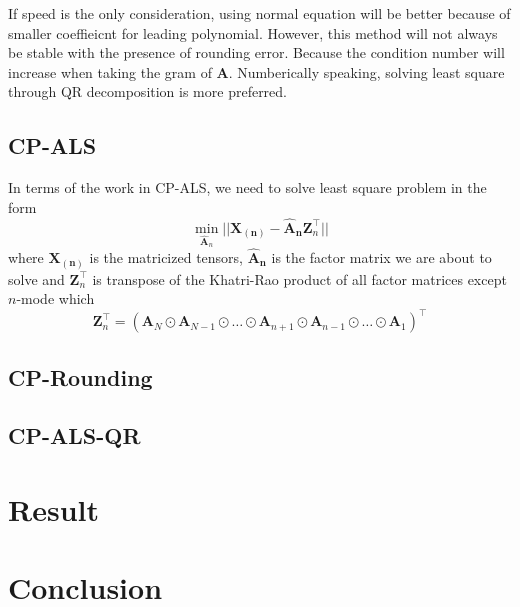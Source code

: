 \documentclass{article}
\newcommand{\mat}[1]{\mathbf{#1}}
\begin{document}
If speed is the only consideration, using normal equation will be better because of smaller coeffieicnt
for leading polynomial. However, this method will not always be stable with the presence of rounding error.
Because the condition number will increase when taking the gram of $\mat{A}$. Numberically speaking, solving least square through QR decomposition
is more preferred.





\subsection*{CP-ALS}
In terms of the work in CP-ALS, we need to solve least square problem in the form 
$$\min_{\mat{\hat{A}}_n}||\mat{X_{(n)}} - {\mat{\hat{A}_n}}\mat{Z}^\top_n ||$$
where $\mat{X_{(n)}}$ is the matricized tensors, $\mat{\hat{A}_n}$ is the factor matrix we are about to solve and 
$\mat{Z}^\top_n$ is transpose of the Khatri-Rao product of all factor matrices except $n$-mode which
$$\mat{Z}^\top_n = (\mat{A}_N \odot \mat{A}_{N-1} \odot \dots \odot \mat{A}_{n+1} \odot \mat{A}_{n-1} \odot \dots \odot \mat{A}_1)^\top $$ 


\subsection*{CP-Rounding}

\subsection*{CP-ALS-QR}




\section*{Result}


\section*{Conclusion}
\end{document}
